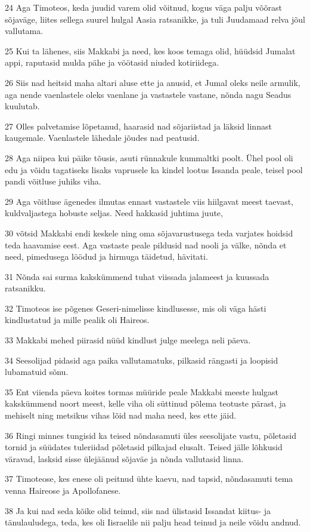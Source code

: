 \par 24 Aga Timoteos, keda juudid varem olid võitnud, kogus väga palju võõrast sõjaväge, liites sellega suurel hulgal Aasia ratsanikke, ja tuli Juudamaad relva jõul vallutama.
\par 25 Kui ta lähenes, siis Makkabi ja need, kes koos temaga olid, hüüdsid Jumalat appi, raputasid mulda pähe ja vöötasid niuded kotiriidega.
\par 26 Siis nad heitsid maha altari aluse ette ja anusid, et Jumal oleks neile armulik, aga nende vaenlastele oleks vaenlane ja vastastele vastane, nõnda nagu Seadus kuulutab.
\par 27 Olles palvetamise lõpetanud, haarasid nad sõjariistad ja läksid linnast kaugemale. Vaenlastele lähedale jõudes nad peatusid.
\par 28 Aga niipea kui päike tõusis, asuti rünnakule kummaltki poolt. Ühel pool oli edu ja võidu tagatiseks lisaks vaprusele ka kindel lootus Issanda peale, teisel pool pandi võitluse juhiks viha.
\par 29 Aga võitluse ägenedes ilmutas ennast vastastele viis hiilgavat meest taevast, kuldvaljastega hobuste seljas. Need hakkasid juhtima juute,
\par 30 võtsid Makkabi endi keskele ning oma sõjavarustusega teda varjates hoidsid teda haavamise eest. Aga vastaste peale pildusid nad nooli ja välke, nõnda et need, pimedusega löödud ja hirmuga täidetud, hävitati.
\par 31 Nõnda sai surma kakskümmend tuhat viissada jalameest ja kuussada ratsanikku.
\par 32 Timoteos ise põgenes Geseri-nimelisse kindlusesse, mis oli väga hästi kindlustatud ja mille pealik oli Haireos.
\par 33 Makkabi mehed piirasid nüüd kindlust julge meelega neli päeva.
\par 34 Seesolijad pidasid aga paika vallutamatuks, pilkasid rängasti ja loopisid lubamatuid sõnu.
\par 35 Ent viienda päeva koites tormas müüride peale Makkabi meeste hulgast kakskümmend noort meest, kelle viha oli süttinud põlema teotuste pärast, ja mehiselt ning metsikus vihas lõid nad maha need, kes ette jäid.
\par 36 Ringi minnes tungisid ka teised nõndasamuti üles seesolijate vastu, põletasid tornid ja süüdates tuleriidad põletasid pilkajad elusalt. Teised jälle lõhkusid väravad, lasksid sisse ülejäänud sõjaväe ja nõnda vallutasid linna.
\par 37 Timoteose, kes enese oli peitnud ühte kaevu, nad tapsid, nõndasamuti tema venna Haireose ja Apollofanese.
\par 38 Ja kui nad seda kõike olid teinud, siis nad ülistasid Issandat kiitus- ja tänulauludega, teda, kes oli Iisraelile nii palju head teinud ja neile võidu andnud.



